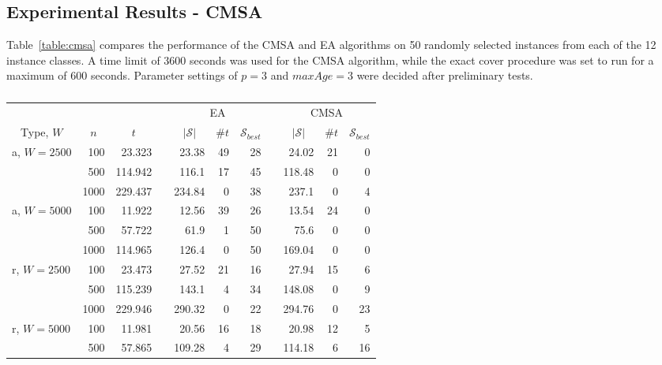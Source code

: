 \documentclass[authoryear]{elsarticle}
\begin{document}
\subsection{Experimental Results - CMSA}
\label{sub:expcmsa}
\noindent Table~\ref{table:cmsa} compares the performance of the CMSA and EA algorithms on 50 randomly selected instances from each of the 12 instance classes. A time limit of 3600 seconds was used for the CMSA algorithm, while the exact cover procedure was set to run for a maximum of 600 seconds. Parameter settings of $p = 3$ and $maxAge = 3$ were decided after preliminary tests. 

\begin{table}[h!]
\centering
\caption{}
\begin{threeparttable}
\begin{tabular}{lrrcrrrcrrr}
	\toprule
	& & & & \multicolumn{3}{c}{EA} &\phantom{ab}& \multicolumn{3}{c}{CMSA}\\
	\cmidrule{5-7} \cmidrule{9-11}
	\multicolumn{1}{c}{Type, $W$} & \multicolumn{1}{c}{$n$} & \multicolumn{1}{c}{$t$\tnote{$a$}} && \multicolumn{1}{c}{$|\mathcal{S}|$\tnote{$b$}} & \multicolumn{1}{c}{$\# t$\tnote{$c$}} & \multicolumn{1}{c}{$\mathcal{S}_{best}$\tnote{$d$}} && \multicolumn{1}{c}{$|\mathcal{S}|$} & \multicolumn{1}{c}{$\# t$} & \multicolumn{1}{c}{$\mathcal{S}_{best}$}\\
	\midrule
	a, $W=2500$ & 100 & 23.323 && 23.38 & 49 & 28 && 24.02 & 21 & 0 \\
	& 500 & 114.942 && 116.1 & 17 & 45 && 118.48 & 0 & 0 \\
	& 1000 & 229.437 && 234.84 & 0 & 38 && 237.1 & 0 & 4 \\
	\midrule
	a, $W=5000$ & 100 & 11.922 && 12.56 & 39 & 26 && 13.54 & 24 & 0 \\
	& 500 & 57.722 && 61.9 & 1 & 50 && 75.6 & 0 & 0 \\
	& 1000 & 114.965 && 126.4 & 0 & 50 && 169.04 & 0 & 0 \\
	\midrule
	\midrule
	r, $W=2500$ & 100 & 23.473 && 27.52 & 21 & 16 && 27.94 & 15 & 6 \\
	& 500 & 115.239 && 143.1 & 4 & 34 && 148.08 & 0 & 9 \\
	& 1000 & 229.946 && 290.32 & 0 & 22 && 294.76 & 0 & 23 \\
	\midrule
	r, $W=5000$ & 100 & 11.981 && 20.56 & 16 & 18 && 20.98 & 12 & 5 \\
	& 500 & 57.865 && 109.28 & 4 & 29 && 114.18 & 6 & 16 \\

\end{tabular}
\end{threeparttable}
\end{table}
\end{document}

